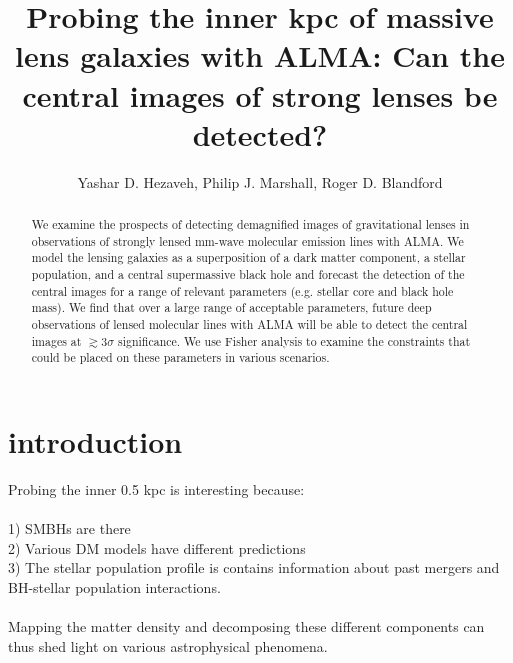 \documentclass[chicago]{emulateapj}
\begin{document}
\title{Probing the inner kpc of massive lens galaxies with ALMA: Can the central images of strong lenses be detected?}
\author{Yashar D. Hezaveh, Philip J. Marshall, Roger D. Blandford}  

\begin{abstract}  
\noindent
We examine the prospects of detecting demagnified images of gravitational lenses in observations of strongly lensed mm-wave molecular emission lines with ALMA. We model the lensing galaxies as a superposition of a dark matter component, a stellar population, and a central supermassive black hole and forecast the detection of the central images for a range of relevant parameters (e.g. stellar core and black hole mass).
We find that over a large range of acceptable parameters, future deep observations of lensed molecular lines with ALMA will be able to detect the central images at $\gtrsim 3\sigma$ significance. We use Fisher analysis to examine the  constraints that could be placed on these parameters in various scenarios. 

\end{abstract}






\section{introduction}
\begin{framed}
Probing the inner 0.5 kpc is interesting because: \\ \\1) SMBHs are there \\2) Various DM models have different predictions \\3) The stellar population profile is contains information about past mergers and BH-stellar population interactions. 
\\
\\
Mapping the matter density and decomposing these different components can thus shed light on various astrophysical phenomena.
\end{framed}
\end{document}
